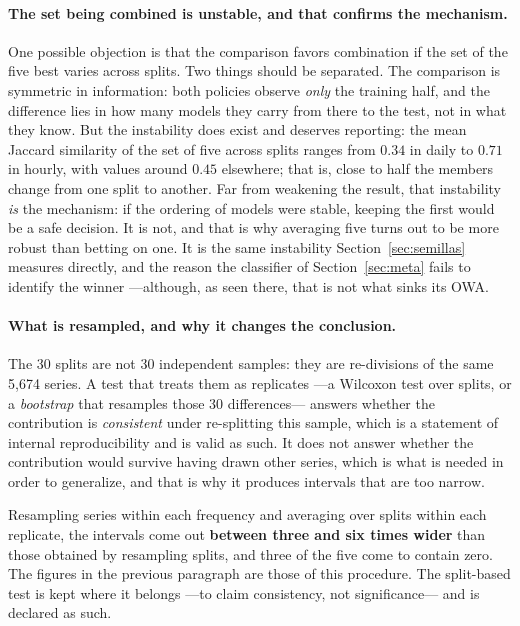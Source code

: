 \paragraph{The set being combined is unstable, and that confirms the mechanism.} One
possible objection is that the comparison favors combination if the set of the five best
varies across splits. Two things should be separated. The comparison is symmetric in
information: both policies observe \emph{only} the training half, and the difference lies
in how many models they carry from there to the test, not in what they know. But the
instability does exist and deserves reporting: the mean Jaccard similarity of the set of
five across splits ranges from $0.34$ in daily to $0.71$ in hourly, with values around
$0.45$ elsewhere; that is, close to half the members change from one split to another. Far
from weakening the result, that instability \emph{is} the mechanism: if the ordering of
models were stable, keeping the first would be a safe decision. It is not, and that is why
averaging five turns out to be more robust than betting on one. It is the same instability
Section~\ref{sec:semillas} measures directly, and the reason the classifier of
Section~\ref{sec:meta} fails to identify the winner ---although, as seen there, that is
not what sinks its OWA.

\paragraph{What is resampled, and why it changes the conclusion.} The 30 splits are not 30
independent samples: they are re-divisions of the same 5{,}674 series. A test that treats
them as replicates ---a Wilcoxon test over splits, or a \emph{bootstrap} that resamples
those 30 differences--- answers whether the contribution is \emph{consistent} under
re-splitting this sample, which is a statement of internal reproducibility and is valid as
such. It does not answer whether the contribution would survive having drawn other series,
which is what is needed in order to generalize, and that is why it produces intervals that
are too narrow.

Resampling series within each frequency and averaging over splits within each replicate,
the intervals come out \textbf{between three and six times wider} than those obtained by
resampling splits, and three of the five come to contain zero. The figures in the previous
paragraph are those of this procedure. The split-based test is kept where it belongs
---to claim consistency, not significance--- and is declared as such.

